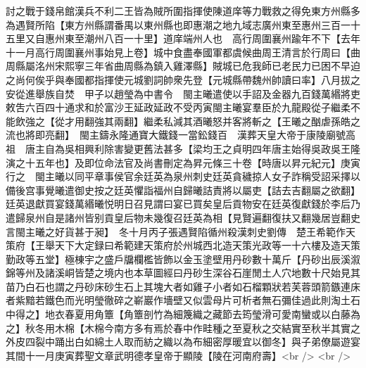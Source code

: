 討之戰于錢帛館漢兵不利二王皆為賊所圍指揮使陳道庠等力戰救之得免東方州縣多為遇賢所陷【東方州縣謂番禺以東州縣也即惠潮之地九域志廣州東至惠州三百一十五里又自惠州東至潮州八百一十里】道庠端州人也　高行周圍襄州踰年不下【去年十一月高行周圍襄州事始見上卷】城中食盡奉國軍都虞候曲周王清言於行周曰【曲周縣屬洺州宋熙寧三年省曲周縣為鎮入雞澤縣】賊城已危我師已老民力已困不早迫之尚何俟乎與奉國都指揮使元城劉詞帥衆先登【元城縣帶魏州帥讀曰率】八月拔之安從進舉族自焚　甲子以趙瑩為中書令　閩主曦遣使以手詔及金器九百錢萬緡將吏敕吿六百四十通求和於富沙王延政延政不受丙寅閩主曦宴羣臣於九龍殿從子繼柔不能飲強之【從才用翻強其兩翻】繼柔私減其酒曦怒并客將斬之【王曦之酗虐孫皓之流也將即亮翻】　閩主鑄永隆通寶大鐵錢一當鈆錢百　漢葬天皇大帝于康陵廟號高祖　唐主自為吳相興利除害變更舊法甚多【梁均王之貞明四年唐主始得吳政吳王隆演之十五年也】及即位命法官及尚書刪定為昇元條三十卷【時唐以昇元紀元】庚寅行之　閩主曦以同平章事侯官余廷英為泉州刺史廷英貪穢掠人女子詐稱受詔采擇以備後宫事覺曦遣御史按之廷英懼詣福州自歸曦詰責將以屬吏【詰去吉翻屬之欲翻】廷英退獻買宴錢萬緡曦悦明日召見謂曰宴已買矣皇后貢物安在廷英復獻錢於李后乃遣歸泉州自是諸州皆别貢皇后物未幾復召廷英為相【見賢遍翻復扶又翻幾居豈翻史言閩主曦之好貨甚于昶】　冬十月丙子張遇賢陷循州殺漢刺史劉傳　楚王希範作天策府【王舉天下大定録曰希範建天策府於州城西北造天策光政等一十六樓及造天策勤政等五堂】極棟宇之盛戶牖欄檻皆飾以金玉塗壁用丹砂數十萬斤【丹砂出辰溪溆錦等州及諸溪峒皆楚之境内也本草圖經曰丹砂生深谷石崖閒土人穴地數十尺始見其苗乃白石也謂之丹砂床砂生石上其塊大者如雞子小者如石榴顆狀若芙蓉頭箭鏃連床者紫黯若鐵色而光明瑩徹碎之嶄巖作墻壁又似雲母片可析者無石彌佳過此則淘土石中得之】地衣春夏用角簟【角簟剖竹為細篾織之藏節去筠瑩滑可愛南蠻或以白藤為之】秋冬用木棉【木棉今南方多有焉於春中作畦種之至夏秋之交結實至秋半其實之外皮四裂中踊出白如綿土人取而紡之織以為布細密厚暖宜以御冬】與子弟僚屬遊宴其間十一月庚寅葬聖文章武明德孝皇帝于顯陵【陵在河南府壽】<br />
<br />
